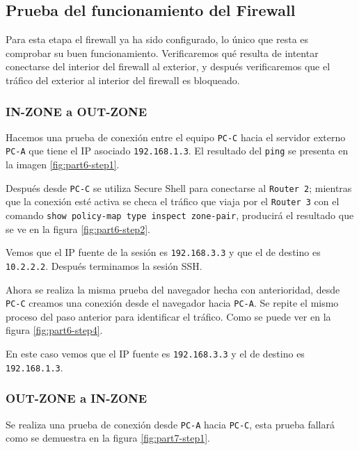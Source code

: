 \documentclass[11pt]{article}
\begin{document}
        \subsection{Prueba del funcionamiento del Firewall}

            Para esta etapa el firewall ya ha sido configurado, lo único que resta es comprobar su buen funcionamiento. Verificaremos qué resulta de intentar conectarse del interior del firewall al exterior, y después verificaremos que el tráfico del exterior al interior del firewall es bloqueado.

            \subsubsection{IN-ZONE a OUT-ZONE}

                Hacemos una prueba de conexión entre el equipo \texttt{PC-C} hacia el servidor externo \texttt{PC-A} que tiene el IP asociado \texttt{192.168.1.3}. El resultado del \texttt{ping} se presenta en la imagen \ref{fig:part6-step1}.

                Después desde \texttt{PC-C} se utiliza Secure Shell para conectarse al \texttt{Router 2}; mientras que la conexión esté activa se checa el tráfico que viaja por el \texttt{Router 3} con el comando \texttt{show policy-map type inspect zone-pair}, producirá el resultado que se ve en la figura \ref{fig:part6-step2}.

                Vemos que el IP fuente de la sesión es \texttt{192.168.3.3} y que el de destino es \texttt{10.2.2.2}. Después terminamos la sesión SSH.

                Ahora se realiza la misma prueba del navegador hecha con anterioridad, desde \texttt{PC-C} creamos una conexión desde el navegador hacia \texttt{PC-A}. Se repite el mismo proceso del paso anterior para identificar el tráfico. Como se puede ver en la figura \ref{fig:part6-step4}.

                En este caso vemos que el IP fuente es \texttt{192.168.3.3} y el de destino es \texttt{192.168.1.3}.

            \subsubsection{OUT-ZONE a IN-ZONE}

                Se realiza una prueba de conexión desde \texttt{PC-A} hacia \texttt{PC-C}, esta prueba fallará como se demuestra en la figura \ref{fig:part7-step1}.
\end{document}
